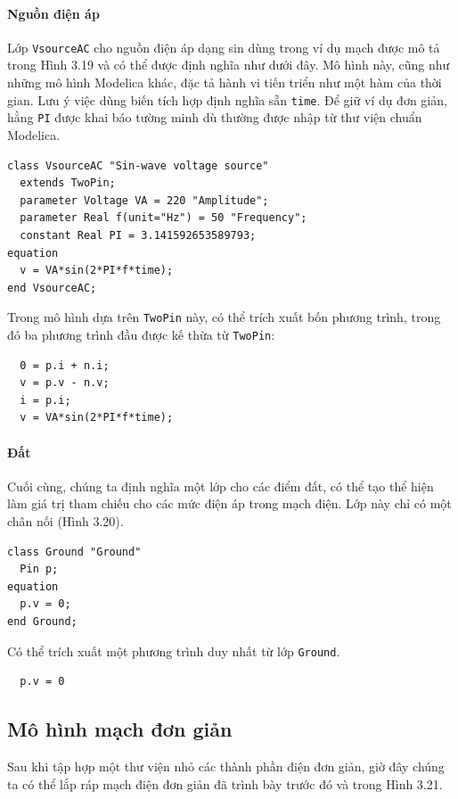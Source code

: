 \paragraph*{Nguồn điện áp}
Lớp \texttt{VsourceAC} cho nguồn điện áp dạng sin dùng trong ví dụ mạch được mô tả trong Hình 3.19 và có thể được định nghĩa như dưới đây. Mô hình này, cũng như những mô hình Modelica khác, đặc tả hành vi tiến triển như một hàm của thời gian. Lưu ý việc dùng biến tích hợp định nghĩa sẵn \texttt{time}. Để giữ ví dụ đơn giản, hằng \texttt{PI} được khai báo tường minh dù thường được nhập từ thư viện chuẩn Modelica.
\begin{verbatim}
class VsourceAC "Sin-wave voltage source"
  extends TwoPin;
  parameter Voltage VA = 220 "Amplitude";
  parameter Real f(unit="Hz") = 50 "Frequency";
  constant Real PI = 3.141592653589793;
equation
  v = VA*sin(2*PI*f*time);
end VsourceAC;
\end{verbatim}
Trong mô hình dựa trên \texttt{TwoPin} này, có thể trích xuất bốn phương trình, trong đó ba phương trình đầu được kế thừa từ \texttt{TwoPin}:

\begin{verbatim}
  0 = p.i + n.i;
  v = p.v - n.v;
  i = p.i;
  v = VA*sin(2*PI*f*time);
\end{verbatim}

\paragraph*{Đất}
Cuối cùng, chúng ta định nghĩa một lớp cho các điểm đất, có thể tạo thể hiện làm giá trị tham chiếu cho các mức điện áp trong mạch điện. Lớp này chỉ có một chân nối (Hình 3.20).
\begin{verbatim}
class Ground "Ground"
  Pin p;
equation
  p.v = 0;
end Ground;
\end{verbatim}
Có thể trích xuất một phương trình duy nhất từ lớp \texttt{Ground}.
\begin{verbatim}
  p.v = 0
\end{verbatim}

\subsection{Mô hình mạch đơn giản}
Sau khi tập hợp một thư viện nhỏ các thành phần điện đơn giản, giờ đây chúng ta có thể lắp ráp mạch điện đơn giản đã trình bày trước đó và trong Hình 3.21.

